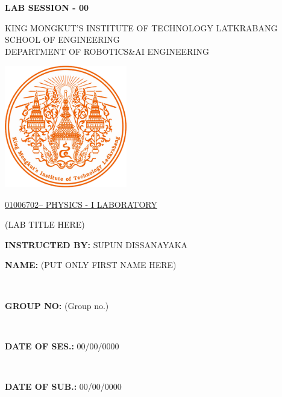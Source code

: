 \documentclass[a4paper,12pt]{article}
\begin{document}
\begin{center}
    \noindent\hfill\textbf{LAB SESSION - 00}  %
    \vspace*{36pt}

    {\fontsize{14}{16}\selectfont
    KING MONGKUT’S INSTITUTE OF TECHNOLOGY LATKRABANG\\
    SCHOOL OF ENGINEERING\\
    DEPARTMENT OF ROBOTICS\&AI ENGINEERING\\
    }

    \vspace{42pt}

    \includegraphics[width=0.4\textwidth]{kmitl_logo.png}\\

    \vspace{56pt}

    {\fontsize{16}{18}\selectfont
        \underline{01006702– PHYSICS - I LABORATORY}\\
    }
    
    \vspace{32pt}

    \begin{center}
        (LAB TITLE HERE)  %
    \end{center}

    \vspace{60pt}

    \begin{flushleft}
        \textbf{INSTRUCTED BY:} \quad SUPUN DISSANAYAKA
    \end{flushleft}

    \vfill

    \begin{flushright}
        \parbox{8cm}{\textbf{NAME:} (PUT ONLY FIRST NAME HERE)}\\  %
        \parbox{8cm}{\textbf{GROUP NO:} (Group no.)}\\  %
        \parbox{8cm}{\textbf{DATE OF SES.:} 00/00/0000}\\  %
        \parbox{8cm}{\textbf{DATE OF SUB.:} 00/00/0000}  %
    \end{flushright}

    \vspace{36pt}

\end{center}
\end{document}
